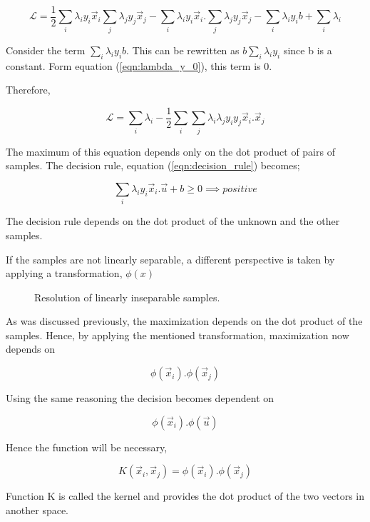 \documentclass[]{article}
\begin{document}
\[
\mathcal{L} = \frac{1}{2} \sum_{i}\lambda_{i} y_{i}  \vec{x}_{i} \sum_{j}\lambda_{j} y_{j}\vec{x}_{j}  - \sum_{i}\lambda_{i} y_{i}  \vec{x}_{i} . \sum_{j}\lambda_{j} y_{j}\vec{x}_{j} - \sum_{i}\lambda_{i} y_{i} b + \sum_{i}\lambda_{i} 
\]

Consider the term $\sum_{i}\lambda_{i} y_{i} b $. This can be rewritten as $b\sum_{i}\lambda_{i} y_{i}$ since b is a constant. Form equation (\ref{eqn:lambda_y_0}), this term is 0.


Therefore,

\begin{equation}
\mathcal{L} = \sum_{i}\lambda_{i} - \frac{1}{2} \sum_{i}\sum_{j} \lambda_{i}\lambda_{j} y_{i} y_{j} \vec{x}_{i}.\vec{x}_{j}
\end{equation}

The maximum of this equation depends only on the dot product of pairs of samples. The decision rule, equation (\ref{eqn:decision_rule}) becomes;

\begin{equation}
\sum_{i} \lambda_{i} y_{i} \vec{x}_{i} . \vec{u} + b \geq 0 \implies positive
\end{equation}

The decision rule depends on the dot product of the unknown and the other samples.

If the samples are not linearly separable, a different perspective is taken by applying a transformation, $\phi(x)$

\begin{figure}[h]
	\centering
	
	\caption{Resolution of linearly inseparable samples.}
	\label{fig:fig8}
\end{figure}
 
As was discussed previously, the maximization depends on the dot product of the samples. Hence, by applying the mentioned transformation, maximization now depends on

\[
\phi(\vec{x}_{i}) . \phi(\vec{x}_{j})
\]

Using the same reasoning the decision becomes dependent on

\[
\phi(\vec{x}_{i}) . \phi(\vec{u})
\]

Hence the function will be necessary,

\begin{equation}
\label{eqn:kernel}
K(\vec{x}_{i}, \vec{x}_{j}) = \phi(\vec{x}_{i}) . \phi(\vec{x}_{j})
\end{equation}

Function K is called the kernel and provides the dot product of the two vectors in another space.
\end{document}
